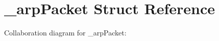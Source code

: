 \hypertarget{struct__arpPacket}{}\section{\+\_\+arp\+Packet Struct Reference}
\label{struct__arpPacket}


Collaboration diagram for \+\_\+arp\+Packet\+:
